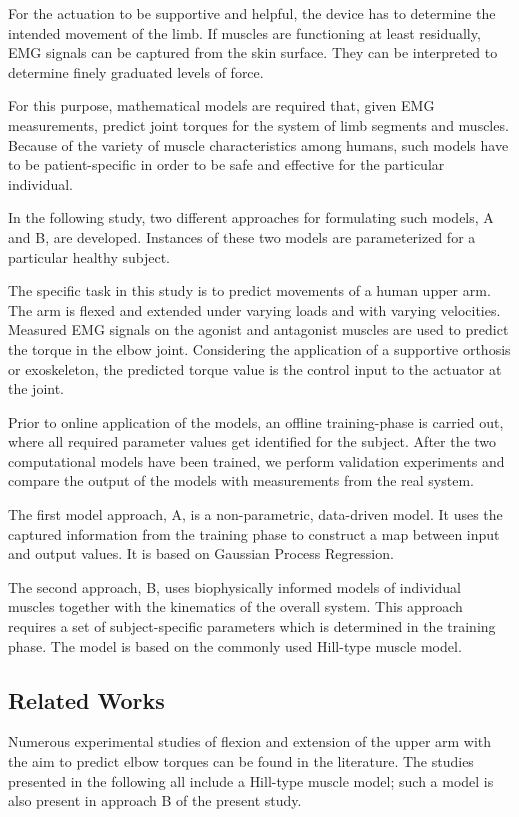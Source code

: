 For the actuation to be supportive and helpful, the device has to determine the intended movement of the limb. If muscles are functioning at least residually, EMG signals can be captured from the skin surface. They can be interpreted to determine finely graduated levels of force.

For this purpose, mathematical models are required that, given EMG measurements, predict joint torques for the system of limb segments and muscles. 
Because of the variety of muscle characteristics among humans, such models have to be patient-specific in order to be safe and effective for the particular individual.

In the following study, two different approaches for formulating such models, A and B, are developed. Instances of these two models are parameterized for a particular healthy subject. 

The specific task in this study is to predict movements of a human upper arm. The arm is flexed and extended under varying loads and with varying velocities. Measured EMG signals on the agonist and antagonist muscles are used to predict the torque in the elbow joint. Considering the application of a supportive orthosis or exoskeleton, the predicted torque value is the control input to the actuator at the joint.

Prior to online application of the models, an offline training-phase is carried out, where all required parameter values get identified for the subject. After the two computational models have been trained, we perform validation experiments and compare the output of the models with measurements from the real system.
 
The first model approach, A, is a non-parametric, data-driven model. It uses the captured information from the training phase to construct a map between input and output values. It is based on Gaussian Process Regression.

The second approach, B, uses biophysically informed models of individual muscles together with the kinematics of the overall system. This approach requires a set of subject-specific parameters which is determined in the training phase. The model is based on the commonly used Hill-type muscle model.

\subsection{Related Works}

%
Numerous experimental studies of flexion and extension of the upper arm with the aim to predict elbow torques can be found in the literature. The studies presented in the following all include a Hill-type muscle model; such a model is also present in approach B of the present study.

